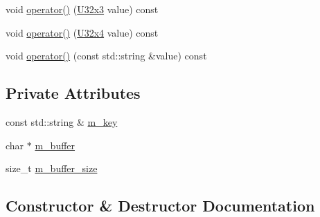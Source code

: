 \begin{DoxyCompactItemize}
void \mbox{\hyperlink{classmage_1_1loader_1_1anonymous__namespace_02var__writer_8cpp_03_1_1_v_a_r_visitor_acbdb4c62f8e4faf2db93aceddfe5185d}{operator()}} (\mbox{\hyperlink{namespacemage_a03e3b6f65630005f43a3112d1f6cf57b}{U32x3}} value) const
\item 
void \mbox{\hyperlink{classmage_1_1loader_1_1anonymous__namespace_02var__writer_8cpp_03_1_1_v_a_r_visitor_ad7780f2bb995d373aa2b414703e0cde3}{operator()}} (\mbox{\hyperlink{namespacemage_a7472d3b2d20045774281eacb22fb5df8}{U32x4}} value) const
\item 
void \mbox{\hyperlink{classmage_1_1loader_1_1anonymous__namespace_02var__writer_8cpp_03_1_1_v_a_r_visitor_a48a61167d197cedaf025c356060c2f00}{operator()}} (const std\+::string \&value) const
\end{DoxyCompactItemize}
\subsection*{Private Attributes}
\begin{DoxyCompactItemize}
\item 
const std\+::string \& \mbox{\hyperlink{classmage_1_1loader_1_1anonymous__namespace_02var__writer_8cpp_03_1_1_v_a_r_visitor_a9d1a59d5ad6d500b69f78482ce8c17fd}{m\+\_\+key}}
\item 
char $\ast$ \mbox{\hyperlink{classmage_1_1loader_1_1anonymous__namespace_02var__writer_8cpp_03_1_1_v_a_r_visitor_aed7e1c3626ff59cefca00ed9d6c9d440}{m\+\_\+buffer}}
\item 
size\+\_\+t \mbox{\hyperlink{classmage_1_1loader_1_1anonymous__namespace_02var__writer_8cpp_03_1_1_v_a_r_visitor_a971641c663ab99d217fafdc02daad45f}{m\+\_\+buffer\+\_\+size}}
\end{DoxyCompactItemize}


\subsection{Constructor \& Destructor Documentation}
\mbox{\label{classmage_1_1loader_1_1anonymous__namespace_02var__writer_8cpp_03_1_1_v_a_r_visitor_afcf7b30fed957c8ba2b76394e21e45d1}} 
